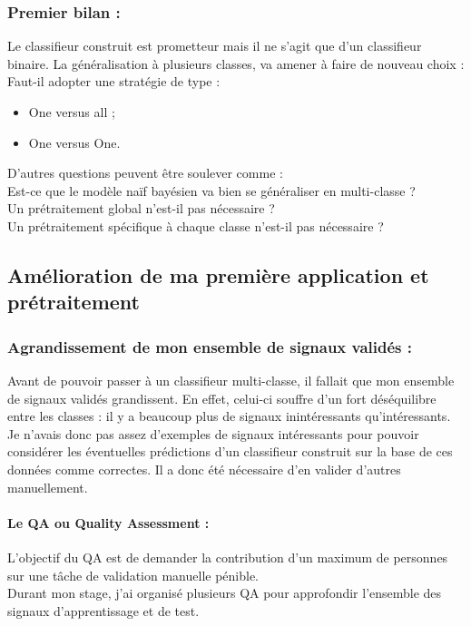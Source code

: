             \subsubsection{Premier bilan :}
                Le classifieur construit est prometteur mais il ne s'agit que d'un classifieur binaire. La généralisation à plusieurs classes, va amener à faire de nouveau choix : Faut-il adopter une stratégie de type :
                \begin{itemize}
                    \item One versus all ;
                    \item One versus One.
                \end{itemize}
                D'autres questions peuvent être soulever comme :\\
                Est-ce que le modèle naïf bayésien va bien se généraliser en multi-classe ?\\
                Un prétraitement global n'est-il pas nécessaire ?\\
                Un prétraitement spécifique à chaque classe n'est-il pas nécessaire ?\\

        \subsection{Amélioration de ma première application et prétraitement}
            \subsubsection{Agrandissement de mon ensemble de signaux validés :}
                Avant de pouvoir passer à un classifieur multi-classe, il fallait que mon ensemble de signaux validés grandissent. En effet, celui-ci souffre d'un fort déséquilibre entre les classes : il y a beaucoup plus de signaux inintéressants qu'intéressants. Je n'avais donc pas assez d'exemples de signaux intéressants pour pouvoir considérer les éventuelles prédictions d'un classifieur construit sur la base de ces données comme correctes. Il a donc été nécessaire d'en valider d'autres manuellement.

                \paragraph{Le QA ou Quality Assessment :}
                    L'objectif du QA est de demander la contribution d'un maximum de personnes sur une tâche de validation manuelle pénible.\\
                    Durant mon stage, j'ai organisé plusieurs QA pour approfondir l'ensemble des signaux d’apprentissage et de test.

